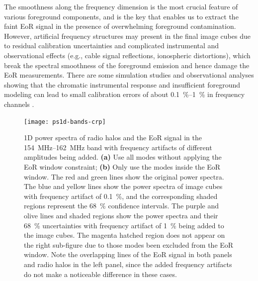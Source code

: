 \documentclass[modern]{aastex62}
\begin{document}
The smoothness along the frequency dimension is the most crucial feature
of various foreground components, and is the key that enables us to
extract the faint EoR signal in the presence of overwhelming foreground
contamination.
However, artificial frequency structures may present in the final image
cubes due to residual calibration uncertainties and complicated
instrumental and observational effects (e.g., cable signal reflections,
ionospheric distortions), which break the spectral smoothness of the
foreground emission and hence damage the EoR measurements.
There are some simulation studies and observational analyses showing that
the chromatic instrumental response and insufficient foreground modeling
can lead to small calibration errors of about
\SIrange[range-units=repeat]{0.1}{1}{\percent} in frequency channels
\citep[e.g.,][]{barry2016,beardsley2016,ewallWice2017}.

\begin{figure}
  \centering
  \texttt{[image: ps1d-bands-crp]}
  \caption{\label{fig:ps1d-bands-crp}%
    1D power spectra of radio halos and the EoR signal in the
    \SIrange{154}{162}{\MHz} band with frequency artifacts of different
    amplitudes being added.
    \textbf{(a)} Use all modes without applying the EoR window constraint;
    \textbf{(b)} Only use the modes inside the EoR window.
    The red and green lines show the original power spectra.
    The blue and yellow lines show the power spectra of image cubes with
    frequency artifact of \SI{0.1}{\percent}, and the corresponding
    shaded regions represent the \SI{68}{\percent} confidence intervals.
    The purple and olive lines and shaded regions show the power spectra
    and their \SI{68}{\percent} uncertainties with frequency artifact of
    \SI{1}{\percent} being added to the image cubes.
    The magenta hatched region does not appear on the right sub-figure
    due to those modes been excluded from the EoR window.
    Note the overlapping lines of the EoR signal in both panels and
    radio halos in the left panel, since the added frequency artifacts
    do not make a noticeable difference in these cases.
  }
\end{figure}
\end{document}
